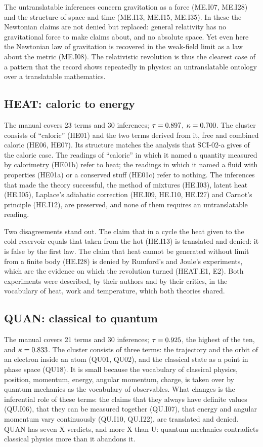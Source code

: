 \documentclass{situationist-preprint}
\begin{document}
The untranslatable inferences concern gravitation as a force (ME.I07, ME.I28) and the structure of space and time (ME.I13, ME.I15, ME.I35). In these the Newtonian claims are not denied but replaced: general relativity has no gravitational force to make claims about, and no absolute space. Yet even here the Newtonian law of gravitation is recovered in the weak-field limit as a law about the metric (ME.I08). The relativistic revolution is thus the clearest case of a pattern that the record shows repeatedly in physics: an untranslatable ontology over a translatable mathematics.

\subsection{HEAT: caloric to energy}

The manual covers 23 terms and 30 inferences; $\tau = 0.897$, $\kappa = 0.700$. The cluster consists of \enquote{caloric} (HE01) and the two terms derived from it, free and combined caloric (HE06, HE07). Its structure matches the analysis that SCI-02-a gives of the caloric case. The readings of \enquote{caloric} in which it named a quantity measured by calorimetry (HE01b) refer to heat; the readings in which it named a fluid with properties (HE01a) or a conserved stuff (HE01c) refer to nothing. The inferences that made the theory successful, the method of mixtures (HE.I03), latent heat (HE.I05), Laplace's adiabatic correction (HE.I09, HE.I10, HE.I27) and Carnot's principle (HE.I12), are preserved, and none of them requires an untranslatable reading.

Two disagreements stand out. The claim that in a cycle the heat given to the cold reservoir equals that taken from the hot (HE.I13) is translated and denied: it is false by the first law. The claim that heat cannot be generated without limit from a finite body (HE.I28) is denied by Rumford's and Joule's experiments, which are the evidence on which the revolution turned (HEAT.E1, E2). Both experiments were described, by their authors and by their critics, in the vocabulary of heat, work and temperature, which both theories shared.

\subsection{QUAN: classical to quantum}

The manual covers 21 terms and 30 inferences; $\tau = 0.925$, the highest of the ten, and $\kappa = 0.833$. The cluster consists of three terms: the trajectory and the orbit of an electron inside an atom (QU01, QU02), and the classical state as a point in phase space (QU18). It is small because the vocabulary of classical physics, position, momentum, energy, angular momentum, charge, is taken over by quantum mechanics as the vocabulary of observables. What changes is the inferential role of these terms: the claims that they always have definite values (QU.I06), that they can be measured together (QU.I07), that energy and angular momentum vary continuously (QU.I10, QU.I22), are translated and denied. QUAN has seven X verdicts, and more X than U: quantum mechanics contradicts classical physics more than it abandons it.
\end{document}
